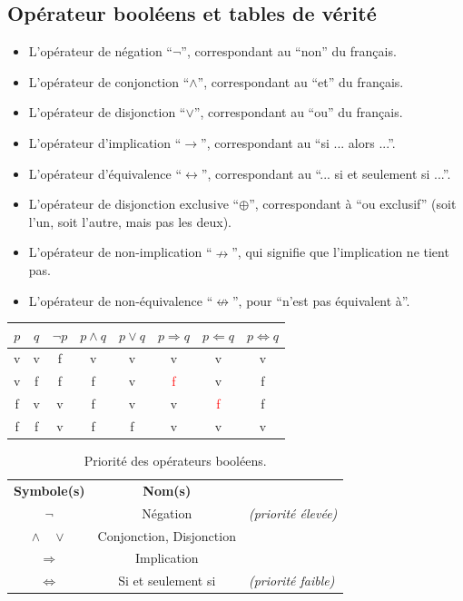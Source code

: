 \documentclass[12]{article}%
\theoremstyle{plain}
\theoremstyle{definition}
\theoremstyle{remark}
\begin{document}
\subsection{Opérateur booléens et tables de vérité}
\begin{itemize}
	\item L’opérateur de négation ``\(\lnot\)'', correspondant au ``non'' du français.
	\item L’opérateur de conjonction ``\(\land\)'', correspondant au ``et'' du français.
	\item L’opérateur de disjonction ``\(\lor\)'', correspondant au ``ou'' du français.
	\item L’opérateur d’implication ``\(\rightarrow\)'', correspondant au ``si ... alors ...''.
	\item L’opérateur d'équivalence ``\(\leftrightarrow\)'', correspondant au ``... si et seulement si ...''.
	\item L’opérateur de disjonction exclusive ``\(\oplus\)'', correspondant à ``ou exclusif'' (soit l’un, soit l’autre, mais pas les deux).
	\item L’opérateur de non-implication ``\(\nrightarrow\)'', qui signifie que l’implication ne tient pas.
	\item L’opérateur de non-équivalence ``\(\not\leftrightarrow\)'', pour ``n'est pas équivalent à''.
\end{itemize}

\begin{center}
	\begin{tabular}{|c|c|c|c|c|c|c|c|}
		\hline
		$p$ & $q$ & $\lnot p$ & $p \land q$ & $p \lor q$ & $p \Rightarrow q$ & $p \Leftarrow q$ & $p \Leftrightarrow q$ \\
		\hline
		v & v & f & v & v & v & v & v \\
		v & f & f & f & v & \textcolor{red}{f} & v & f \\
		f & v & v & f & v & v & \textcolor{red}{f} & f \\
		f & f & v & f & f & v & v & v \\
		\hline
	\end{tabular}
\end{center}

\begin{table}[h!]
	\centering
	\caption{Priorité des opérateurs booléens.}
	\begin{tabular}{@{}c@{\quad}c@{\qquad}l@{}}
		\textbf{Symbole(s)} & \textbf{Nom(s)} &  \\
		$\neg$              & Négation        & \textit{(priorité élevée) }\\
		$\land \quad \lor$  & Conjonction, Disjonction &                   \\
		$\Rightarrow$       & Implication     &                              \\
		$\Leftrightarrow$   & Si et seulement si & \textit{(priorité faible)} \\
	\end{tabular}
\end{table}
\end{document}
